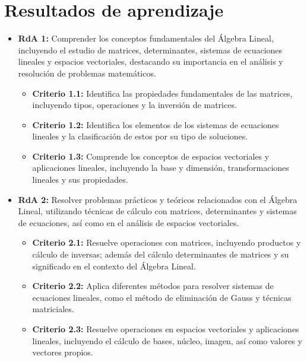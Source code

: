 \documentclass[a4,11pt]{aleph-notas}
\begin{document}
\addtolength{\headheight}{1.8\baselineskip}
\addtolength{\voffset}{-1.5\baselineskip}

\encabezado

\section{Resultados de aprendizaje} 

\begin{itemize}[leftmargin=*]
\item 
    \textbf{RdA 1:} Comprender los conceptos fundamentales del Álgebra Lineal, incluyendo el estudio de matrices, determinantes, sistemas de ecuaciones lineales y espacios vectoriales, destacando su importancia en el análisis y resolución de problemas matemáticos.
    \begin{itemize}[leftmargin=*]
        \item \textbf{Criterio 1.1:}  Identifica las propiedades fundamentales de las matrices, incluyendo tipos, operaciones y la inversión de matrices.
        \item \textbf{Criterio 1.2:} Identifica los elementos de los sistemas de ecuaciones lineales y la clasificación de estos por su tipo de soluciones.
        \item \textbf{Criterio 1.3:} Comprende los conceptos de espacios vectoriales y aplicaciones lineales, incluyendo la base y dimensión, transformaciones lineales y sus propiedades.
    \end{itemize}
\item 
    \textbf{RdA 2:} Resolver problemas prácticos y teóricos relacionados con el Álgebra Lineal, utilizando técnicas de cálculo con matrices, determinantes y sistemas de ecuaciones, así como en el análisis de espacios vectoriales.
    \begin{itemize}[leftmargin=*]
        \item \textbf{Criterio 2.1:} Resuelve operaciones con matrices, incluyendo productos y cálculo de inversas; además del cálculo determinantes de matrices y su significado en el contexto del Álgebra Lineal.
        \item \textbf{Criterio 2.2:} Aplica diferentes métodos para resolver sistemas de ecuaciones lineales, como el método de eliminación de Gauss y técnicas matriciales.
        \item \textbf{Criterio 2.3:} Resuelve operaciones en espacios vectoriales y aplicaciones lineales, incluyendo el cálculo de bases, núcleo, imagen, así como valores y vectores propios.

\end{itemize}
\end{itemize}
\end{document}

